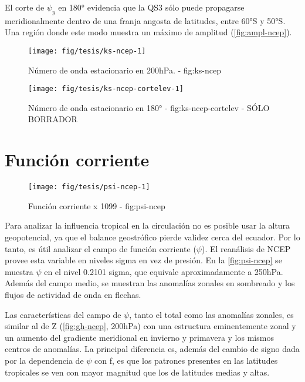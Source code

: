 \documentclass[spanish,a4paper]{book}
\begin{document}
El corte de \(\psi_y\) en 180° evidencia que la QS3 sólo puede
propagarse meridionalmente dentro de una franja angosta de latitudes,
entre 60°S y 50°S. Una región donde este modo muestra un máximo de
amplitud (\autoref{fig:ampl-ncep}).

\begin{figure*}
\texttt{[image: fig/tesis/ks-ncep-1]} \caption{Número de onda estacionario en 200hPa. - fig:ks-ncep}\label{fig:ks-ncep}
\end{figure*}

\begin{figure*}
\texttt{[image: fig/tesis/ks-ncep-cortelev-1]} \caption{Número de onda estacionario en 180° - fig:ks-ncep-cortelev - SÓLO BORRADOR}\label{fig:ks-ncep-cortelev}
\end{figure*}

\section{Función corriente}\label{funcion-corriente}

\begin{landscape}\begin{figure}

{\centering \texttt{[image: fig/tesis/psi-ncep-1]} 

}

\caption{Función corriente x 1099 - fig:psi-ncep}\label{fig:psi-ncep}
\end{figure}
\end{landscape}

Para analizar la influencia tropical en la circulación no es posible
usar la altura geopotencial, ya que el balance geostrófico pierde
validez cerca del ecuador. Por lo tanto, es útil analizar el campo de
función corriente (\(\psi\)). El reanálisis de NCEP provee esta variable
en niveles sigma en vez de presión. En la \autoref{fig:psi-ncep} se
muestra \(\psi\) en el nivel 0.2101 sigma, que equivale aproximadamente
a 250hPa. Además del campo medio, se muestran las anomalías zonales en
sombreado y los flujos de actividad de onda en flechas.

Las características del campo de \(\psi\), tanto el total como las
anomalías zonales, es similar al de Z (\autoref{fig:gh-ncep}, 200hPa)
con una estructura eminentemente zonal y un aumento del gradiente
meridional en invierno y primavera y los mismos centros de anomalías. La
principal diferencia es, además del cambio de signo dada por la
dependencia de \(\psi\) con f, es que los patrones presentes en las
latitudes tropicales se ven con mayor magnitud que los de latitudes
medias y altas.
\end{document}
